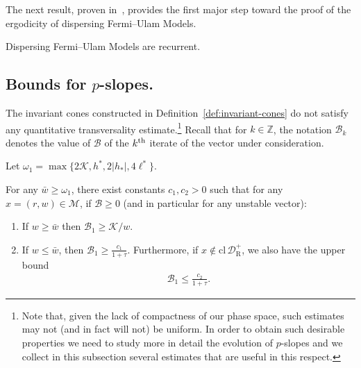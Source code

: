 \documentclass[AHL, Unicode, longabstracts,published]{cedram}
\newcommand{\nin}{\not\in}
\newcommand{\ct}{r}
\newcommand{\cl}[1]{\mathrm{cl}\,#1}
\newcommand{\integers}{\mathbb{Z}}
\newcommand{\cB}{\mathcal{B}}
\newcommand{\cK}{\mathcal{K}}
\newcommand{\pslope}{\mathcal{B}}
\newcommand{\cell}{\mathcal{D}}
\newcommand{\csp}{\mathcal{M}}
\newcommand{\privateu}[1]{#1^*}
\newcommand{\privatel}[1]{#1_*}
\newcommand{\slope}{h}
\newcommand{\slopeu}{\privateu{\slope}}
\newcommand{\slopel}{\privatel{\slope}}
\newcommand{\ellu}{\privateu{\ell}}
\newcommand{\recoPrivate}{\mathrm{R}}
\newcommand{\backReco}{{\cell^+_{\recoPrivate}}}
\newcommand{\ppPrivate}[2]{#1^{#2}}
\newcommand{\prePrivate}[1]{\ppPrivate{#1}{-}}
\newcommand{\prpslope}{\prePrivate{\pslope}}
\newcommand{\llw}{\stackunder[1.2pt]{$w$}{\rule{.8ex}{.075ex}}}
\newcommand{\law}[1]{\omega_{#1}}
\newcommand*\DS{\displaystyle}
\renewcommand{\prpslope}{\cB}
\renewcommand{\llw}{\law{1}}
\renewcommand{\prpslope}{\cB}
\renewcommand{\prpslope}{\cB}
\newcommand*{\relabel}{\renewcommand{\labelenumi}{(\theenumi)}}
\newcommand*{\alphenumi}{\renewcommand*{\theenumi}{\alph{enumi}}\relabel}
\begin{document}
The next result, proven in~\cite{fum}, provides the first major step toward the proof of the ergodicity of dispersing Fermi--Ulam Models.
\begin{theo}\label{ThRec}
Dispersing Fermi--Ulam Models are recurrent.
\end{theo}

\subsection{Bounds for \texorpdfstring{$p$}{p}-slopes.} The invariant cones constructed in Definition~\ref{def:invariant-cones} do not satisfy any quantitative transversality estimate.\footnote{Note that, given the lack of compactness of our phase space, such estimates may not (and in fact will not) be uniform. In order to obtain such desirable properties we need to study more in detail the evolution of $p$-slopes and we collect in this subsection several estimates that are useful in this respect.} Recall that for $k\in\integers$, the notation $\prpslope_k$ denotes the value of $\prpslope$ of the $k^{\rm th}$ iterate of the vector under consideration.

Let $\llw = \max\{2\cK,\slopeu,2|\slopel|,4\ellu\}$.

\begin{lemm}\label{LmPSlopeC0}
For any $\bar w\ge \llw$, there exist constants $c_1, c_2 > 0$ such that for any $x = (\ct,w)\in \csp$, if $\prpslope\ge 0$ (and in particular for any unstable vector):
\begin{enumerate}\alphenumi
\item\label{lemm4.12.1} If $w\geq \bar w$ then $\prpslope_{1}\geq \cK/w$.
\item\label{lemm4.12.2} If $w\leq \bar w$, then $\DS
\prpslope_1\geq \frac{c_1}{1+\tau}. $ Furthermore, if $x\nin\cl\backReco$, we also have the upper bound
\begin{align*}
\prpslope_{1}\leq \frac{c_2}{1+\tau}.
\end{align*}
\end{enumerate}
\end{lemm}
\end{document}
